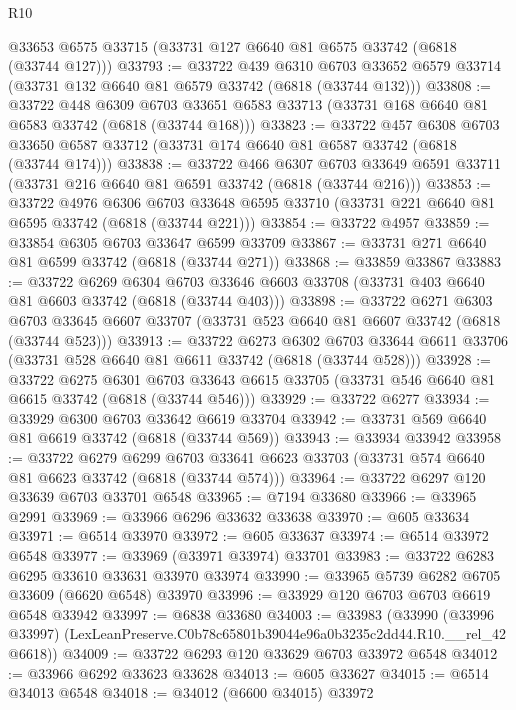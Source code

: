 \begin{lexlean}{R10}
\begin{coremodule}
    @33653
    @6575
    @33715
    (@33731 @127 @6640 @81 @6575 @33742 (@6818 (@33744 @127)))
@33793 := @33722
    @439
    @6310
    @6703
    @33652
    @6579
    @33714
    (@33731 @132 @6640 @81 @6579 @33742 (@6818 (@33744 @132)))
@33808 := @33722
    @448
    @6309
    @6703
    @33651
    @6583
    @33713
    (@33731 @168 @6640 @81 @6583 @33742 (@6818 (@33744 @168)))
@33823 := @33722
    @457
    @6308
    @6703
    @33650
    @6587
    @33712
    (@33731 @174 @6640 @81 @6587 @33742 (@6818 (@33744 @174)))
@33838 := @33722
    @466
    @6307
    @6703
    @33649
    @6591
    @33711
    (@33731 @216 @6640 @81 @6591 @33742 (@6818 (@33744 @216)))
@33853 := @33722
    @4976
    @6306
    @6703
    @33648
    @6595
    @33710
    (@33731 @221 @6640 @81 @6595 @33742 (@6818 (@33744 @221)))
@33854 := @33722 @4957
@33859 := @33854 @6305 @6703 @33647 @6599 @33709
@33867 := @33731 @271 @6640 @81 @6599 @33742 (@6818 (@33744 @271))
@33868 := @33859 @33867
@33883 := @33722
    @6269
    @6304
    @6703
    @33646
    @6603
    @33708
    (@33731 @403 @6640 @81 @6603 @33742 (@6818 (@33744 @403)))
@33898 := @33722
    @6271
    @6303
    @6703
    @33645
    @6607
    @33707
    (@33731 @523 @6640 @81 @6607 @33742 (@6818 (@33744 @523)))
@33913 := @33722
    @6273
    @6302
    @6703
    @33644
    @6611
    @33706
    (@33731 @528 @6640 @81 @6611 @33742 (@6818 (@33744 @528)))
@33928 := @33722
    @6275
    @6301
    @6703
    @33643
    @6615
    @33705
    (@33731 @546 @6640 @81 @6615 @33742 (@6818 (@33744 @546)))
@33929 := @33722 @6277
@33934 := @33929 @6300 @6703 @33642 @6619 @33704
@33942 := @33731 @569 @6640 @81 @6619 @33742 (@6818 (@33744 @569))
@33943 := @33934 @33942
@33958 := @33722
    @6279
    @6299
    @6703
    @33641
    @6623
    @33703
    (@33731 @574 @6640 @81 @6623 @33742 (@6818 (@33744 @574)))
@33964 := @33722 @6297 @120 @33639 @6703 @33701 @6548
@33965 := @7194 @33680
@33966 := @33965 @2991
@33969 := @33966 @6296 @33632 @33638
@33970 := @605 @33634
@33971 := @6514 @33970
@33972 := @605 @33637
@33974 := @6514 @33972 @6548
@33977 := @33969 (@33971 @33974) @33701
@33983 := @33722 @6283 @6295 @33610 @33631 @33970 @33974
@33990 := @33965 @5739 @6282 @6705 @33609 (@6620 @6548) @33970
@33996 := @33929 @120 @6703 @6703 @6619 @6548 @33942
@33997 := @6838 @33680
@34003 := @33983
    (@33990 (@33996 @33997) (LexLeanPreserve.C0b78c65801b39044e96a0b3235c2dd44.R10.__rel_42 @6618))
@34009 := @33722 @6293 @120 @33629 @6703 @33972 @6548
@34012 := @33966 @6292 @33623 @33628
@34013 := @605 @33627
@34015 := @6514 @34013 @6548
@34018 := @34012 (@6600 @34015) @33972

\end{coremodule}
\end{lexlean}
